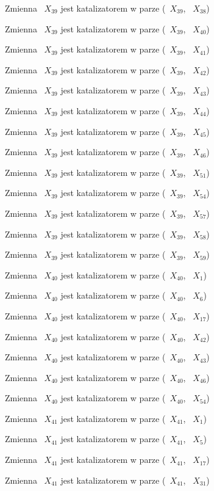 \documentclass{article}
\begin{document}
Zmienna ~$X_{39}$ jest katalizatorem w parze (~$X_{39}$, ~$X_{38}$)

Zmienna ~$X_{39}$ jest katalizatorem w parze (~$X_{39}$, ~$X_{40}$)

Zmienna ~$X_{39}$ jest katalizatorem w parze (~$X_{39}$, ~$X_{41}$)

Zmienna ~$X_{39}$ jest katalizatorem w parze (~$X_{39}$, ~$X_{42}$)

Zmienna ~$X_{39}$ jest katalizatorem w parze (~$X_{39}$, ~$X_{43}$)

Zmienna ~$X_{39}$ jest katalizatorem w parze (~$X_{39}$, ~$X_{44}$)

Zmienna ~$X_{39}$ jest katalizatorem w parze (~$X_{39}$, ~$X_{45}$)

Zmienna ~$X_{39}$ jest katalizatorem w parze (~$X_{39}$, ~$X_{46}$)

Zmienna ~$X_{39}$ jest katalizatorem w parze (~$X_{39}$, ~$X_{51}$)

Zmienna ~$X_{39}$ jest katalizatorem w parze (~$X_{39}$, ~$X_{54}$)

Zmienna ~$X_{39}$ jest katalizatorem w parze (~$X_{39}$, ~$X_{57}$)

Zmienna ~$X_{39}$ jest katalizatorem w parze (~$X_{39}$, ~$X_{58}$)

Zmienna ~$X_{39}$ jest katalizatorem w parze (~$X_{39}$, ~$X_{59}$)

Zmienna ~$X_{40}$ jest katalizatorem w parze (~$X_{40}$, ~$X_{1}$)

Zmienna ~$X_{40}$ jest katalizatorem w parze (~$X_{40}$, ~$X_{6}$)

Zmienna ~$X_{40}$ jest katalizatorem w parze (~$X_{40}$, ~$X_{17}$)

Zmienna ~$X_{40}$ jest katalizatorem w parze (~$X_{40}$, ~$X_{42}$)

Zmienna ~$X_{40}$ jest katalizatorem w parze (~$X_{40}$, ~$X_{43}$)

Zmienna ~$X_{40}$ jest katalizatorem w parze (~$X_{40}$, ~$X_{46}$)

Zmienna ~$X_{40}$ jest katalizatorem w parze (~$X_{40}$, ~$X_{54}$)

Zmienna ~$X_{41}$ jest katalizatorem w parze (~$X_{41}$, ~$X_{1}$)

Zmienna ~$X_{41}$ jest katalizatorem w parze (~$X_{41}$, ~$X_{5}$)

Zmienna ~$X_{41}$ jest katalizatorem w parze (~$X_{41}$, ~$X_{17}$)

Zmienna ~$X_{41}$ jest katalizatorem w parze (~$X_{41}$, ~$X_{31}$)
\end{document}
